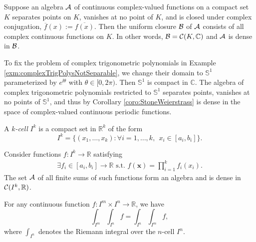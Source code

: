 \begin{coro}
  \label{coro:StoneWeierstrass}
  Suppose an algebra ${\cal A}$ of continuous complex-valued functions
  on a compact set $K$
  separates points on $K$, vanishes at no point of $K$, 
  and is closed under complex conjugation, %
  $\overline{f}(x):=\overline{f(x)}$. 
  Then the uniform closure ${\cal B}$ of ${\cal A}$
  consists of all complex continuous functions on $K$.
  In other words,
  ${\cal B}={\cal C}(K, \mathbb{C})$
  and ${\cal A}$ is dense in ${\cal B}$.
\end{coro}

\begin{exm}
  To fix the problem of complex trigonometric polynomials
  in Example \ref{exm:complexTrigPolysNotSeparable},
  we change their domain to $\mathbb{S}^1$
  parameterized by $e^{\ii \theta}$ with $\theta\in[0,2\pi)$.
  Then $\mathbb{S}^1$ is compact in $\mathbb{C}$. 
  The algebra of complex trigonometric polynomials
  restricted to $\mathbb{S}^1$ separates points, 
  vanishes at no points of $\mathbb{S}^1$,
  and thus by Corollary \ref{coro:StoneWeierstrass}
  is dense in the space of complex-valued continuous periodic functions.
\end{exm}

\begin{defn}
  \label{def:kCell}
  A \emph{$k$-cell} $I^k$ is a compact set in $\mathbb{R}^k$
  of the form
  \begin{equation}
    \label{eq:kCell}
    I^k = \{(x_1,\ldots, x_k): \forall i=1,\ldots,k,\ \ 
    x_i\in[a_i, b_i]\}. 
  \end{equation}
\end{defn}

\begin{lem}
  \label{lem:factoredFunc}
  Consider functions $f: I^k\rightarrow \mathbb{R}$
  satisfying
  \begin{equation}
    \label{eq:factoredFunc}
    \begin{array}{l}
      \exists f_i\in[a_i,b_i]\rightarrow \mathbb{R} \text{ s.t. }
      f(\mathbf{x}) = \prod_{i=1}^k f_i(x_i).
    \end{array}
  \end{equation}
  The set ${\cal A}$ of all finite sums of such functions
  form an algebra and is dense in ${\cal C}(I^k,\mathbb{R})$.
\end{lem}

\begin{coro}%
  \label{coro:FubiniOnKcell}
  For any continuous function $f: I^m\times I^n \rightarrow \mathbb{R}$,
  we have
  \begin{equation}
    \label{eq:FubiniOnKcell}
    \int_{I^m} \int_{I^n} f = \int_{I^n} \int_{I^m} f,
  \end{equation}
  where $\int_{I^n}$ denotes the Riemann integral
  over the $n$-cell $I^n$.
\end{coro}



